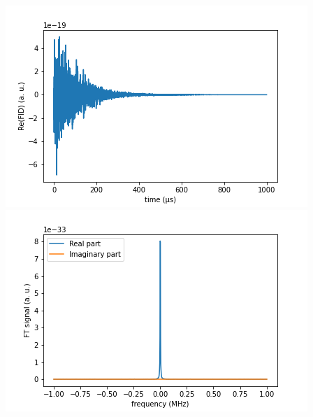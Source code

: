 \documentclass[10pt]{beamer}
\begin{document}
\begin{frame}
$$\begin{columns}[T]
\begin{column}{.5\textwidth}
\begin{column}{.5\textwidth}
\end{column}
\end{column}
\begin{column}{.5\textwidth}
\includegraphics[width=\textwidth]{./spin1-2/13uncorrelated_mixed_hyperfine/FIDSignal.png}
\includegraphics[width=\textwidth]{./spin1-2/13uncorrelated_mixed_hyperfine/FTSignal.png}
\end{column}
\end{columns}
\end{frame}
\end{document}

